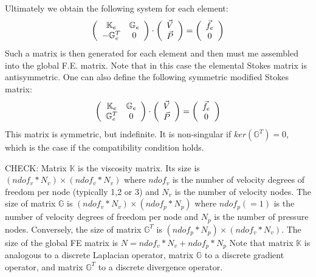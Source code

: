 Ultimately we obtain the following system for each element:
\[
\left(
\begin{array}{cc}
{\mathbb{K}}_e & {\mathbb{G}}_e \\
-{\mathbb{G}}_e^T & 0
\end{array}
\right)
\cdot
\left(
\begin{array}{c}
\vec{V} \\ \vec{P} 
\end{array}
\right)
=
\left(
\begin{array}{c}
\vec{f}_e \\ 0 
\end{array}
\right)
\]
Such a matrix is then generated for each element and then must me assembled into the 
global F.E. matrix. 
Note that in this case the elemental Stokes matrix is antisymmetric. 
One can also define the following symmetric modified Stokes matrix:
\[
\left(
\begin{array}{cc}
{\mathbb{K}}_e & {\mathbb{G}}_e \\
{\mathbb{G}}_e^T & 0
\end{array}
\right)
\cdot
\left(
\begin{array}{c}
\vec{V} \\ \vec{P} 
\end{array}
\right)
=
\left(
\begin{array}{c}
\vec{f}_e \\ 0 
\end{array}
\right)
\]
This matrix is symmetric, but indefinite. It is non-singular if $ker(\mathbb{G}^T)={ 0}$, which is the case if 
the compatibility condition holds.





{\color{red} CHECK:}
Matrix $\mathbb{K}$ is the viscosity matrix. Its size is $(ndof_v * N_v)\times (ndof_v * N_v)$ where $ndof_v$ is the number of velocity degrees of freedom per node (typically 1,2 or 3) and $N_v$ is the number of velocity nodes.
The size of matrix $\mathbb{G}$ is $(ndof_v * N_v)\times (ndof_p * N_p)$ where $ndof_p(=1)$  is the number of velocity degrees of freedom per node and $N_p$ is the number of pressure nodes. Conversely, the size of matrix $\mathbb{G}^T$ is $(ndof_p * N_p)\times (ndof_v * N_v)$.
The size of the global FE matrix is $N = ndof_v * N_v + ndof_p * N_p$
Note that matrix $\mathbb{K}$ is analogous to a discrete Laplacian operator, matrix $\mathbb{G}$ to a discrete gradient operator, and matrix $\mathbb{G}^T$ to a discrete divergence operator.






